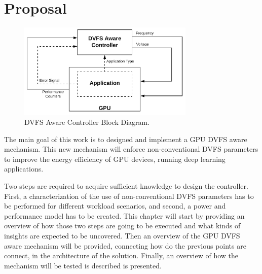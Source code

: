 
\chapter{Proposal}
\label{chapter:implementation}
\begin{figure}[!htb]
  \centering
  \includegraphics[width=0.75\textwidth]{Figures/Proposel/DVFS_Aware_Controller.png}
  \caption[Controller]{DVFS Aware Controller Block Diagram.}
  \label{fig:controlerDVFSaware}
\end{figure}

The main goal of this work is to designed and implement a GPU DVFS aware mechanism. This new mechanism will enforce non-conventional DVFS parameters to improve the energy efficiency of GPU devices, running deep learning applications. 

Two steps are required to acquire sufficient knowledge to design the controller. First, a characterization of the use of non-conventional DVFS parameters has to be performed for different workload scenarios, and second, a power and performance model has to be created. This chapter will start by providing an overview of how those two steps are going to be executed and what kinds of insights are expected to be uncovered. Then an overview of the GPU DVFS aware mechanism will be provided, connecting how do the previous points are connect, in the architecture of the solution. Finally, an overview of how the mechanism will be tested is described is presented.

